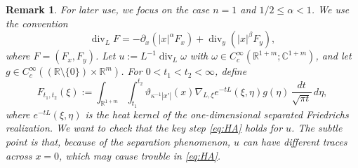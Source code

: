 \documentclass[12pt]{amsart}
\newtheorem{remark}[theorem]{Remark}
\begin{document}
\begin{remark}\label{re:harmonic:annihilation}
For later use, we focus on the case $n=1$ and $1/2 \le \alpha <1$. We use the convention
\begin{equation*}
\operatorname{div}_L F = -\partial_x(|x|^\alpha F_x) +\operatorname{div}_y(|x|^\beta F_y),
\end{equation*}
where $F = (F_x, F_y)$. 
Let $u:= L^{-1} \operatorname{div}_L \omega$ with $\omega \in C_c^\infty(\mathbb R^{1+m};\mathbb C^{1+m})$, and let $g\in C_c^\infty((\mathbb R\setminus\{0\})\times\mathbb R^m)$. For $0<t_1 < t_2 < \infty$, define
\begin{equation*}
F_{t_1,t_2}(\xi) := \int_{\mathbb R^{1+m}} \int_{t_1}^{t_2} \vartheta_{\kappa^{-1} |x'|}(x) \nabla_{L,\xi}e^{-tL}(\xi,\eta) g(\eta) \, \frac{dt}{\sqrt{\pi t}} \, d\eta ,
\end{equation*}
where $e^{-tL}(\xi,\eta)$ is the heat kernel of the one-dimensional separated Friedrichs realization. We want to check that the key step \eqref{eq:HA} holds for $u$. The subtle point is that, because of the separation phenomenon, $u$ can have different traces across $x=0$, which may cause trouble in \eqref{eq:HA}.


\end{remark}
\end{document}
